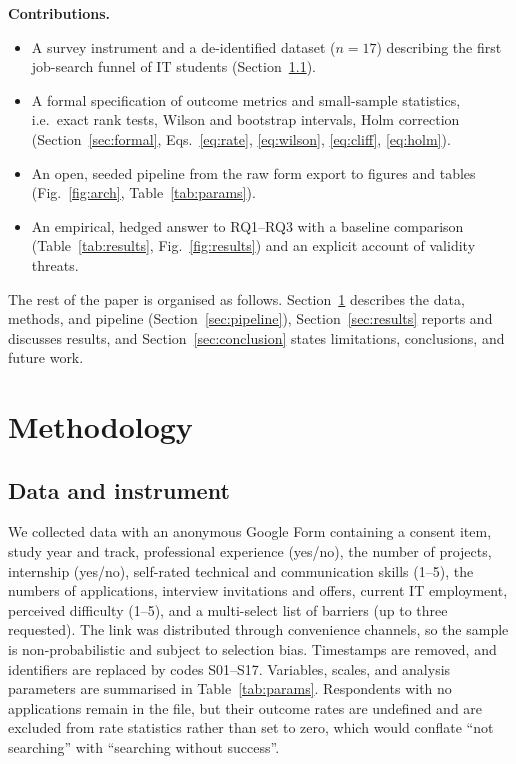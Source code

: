 \documentclass[conference]{IEEEtran}
\begin{document}
\textbf{Contributions.}
\begin{itemize}
 \item A survey instrument and a de-identified dataset ($n=17$) describing the first job-search funnel of IT students (Section~\ref{sec:data}).
 \item A formal specification of outcome metrics and small-sample statistics, i.e.\ exact rank tests, Wilson and bootstrap intervals, Holm correction (Section~\ref{sec:formal}, Eqs.~\eqref{eq:rate}, \eqref{eq:wilson}, \eqref{eq:cliff}, \eqref{eq:holm}).
 \item An open, seeded pipeline from the raw form export to figures and tables (Fig.~\ref{fig:arch}, Table~\ref{tab:params}).
 \item An empirical, hedged answer to RQ1--RQ3 with a baseline comparison (Table~\ref{tab:results}, Fig.~\ref{fig:results}) and an explicit account of validity threats.
\end{itemize}

The rest of the paper is organised as follows. Section~\ref{sec:method} describes the data, methods, and pipeline (Section~\ref{sec:pipeline}), Section~\ref{sec:results} reports and discusses results, and Section~\ref{sec:conclusion} states limitations, conclusions, and future work.

\section{Methodology}
\label{sec:method}

\subsection{Data and instrument}
\label{sec:data}
We collected data with an anonymous Google Form containing a consent item, study year and track, professional experience (yes/no), the number of projects, internship (yes/no), self-rated technical and communication skills (1--5), the numbers of applications, interview invitations and offers, current IT employment, perceived difficulty (1--5), and a multi-select list of barriers (up to three requested). The link was distributed through convenience channels, so the sample is non-probabilistic and subject to selection bias. Timestamps are removed, and identifiers are replaced by codes S01--S17. Variables, scales, and analysis parameters are summarised in Table~\ref{tab:params}. Respondents with no applications remain in the file, but their outcome rates are undefined and are excluded from rate statistics rather than set to zero, which would conflate ``not searching'' with ``searching without success''.
\end{document}

